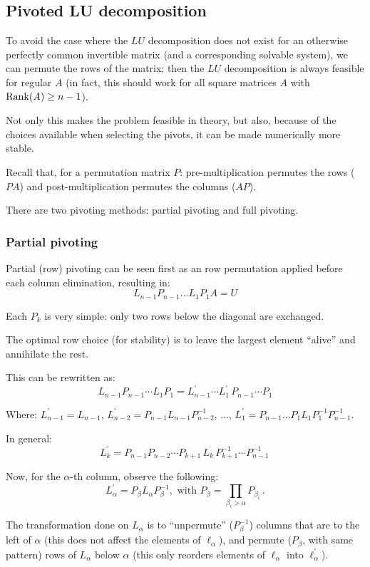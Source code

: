\documentclass[
  12pt,
  paper=a4,
]{scrartcl} %
\begin{document}
\subsection*{Pivoted LU decomposition}

To avoid the case where the $LU$ decomposition does not exist for an otherwise perfectly common invertible matrix (and a corresponding solvable system), we can permute the rows of the matrix; then the $LU$ decomposition is always feasible for regular $A$ (in fact, this should work for all square matrices $A$ with $\operatorname{Rank}(A) \ge n-1$).

Not only this makes the problem feasible in theory, but also, because of the choices available when selecting the pivots, it can be made numerically more stable.

Recall that, for a permutation matrix $P$: pre-multiplication permutes the rows ($PA$) and post-multiplication permutes the columns ($AP$).

There are two pivoting methods: partial pivoting and full pivoting.

\subsubsection*{Partial pivoting}

Partial (row) pivoting can be seen first as an row permutation applied before each column elimination, resulting in:
    \[L_{n-1}P_{n-1}...L_{1}P_{1} A = U\]

Each $P_k$ is very simple: only two rows below the diagonal are exchanged.
    
The optimal row choice (for stability) is to leave the largest element ``alive'' and annihilate the rest.
    
This can be rewritten as:
\[
    L_{n-1}P_{n-1} \cdots L_{1}P_{1} =
    L_{n-1}^\prime \cdots L_1^\prime \, P_{n-1} \cdots P_{1}
\]
    
Where: $L_{n-1}^{\prime} = L_{n-1}$, $L_{n-2}^{\prime} = P_{n-1} L_{n-1}P_{n-2}^{-1}$, ..., $L_1^\prime = P_{n-1}...P_1 L_1 P_1^{-1} P_{n-1}^{-1}$.
    
In general:
\[L^\prime_k =
    P_{n-1}P_{n-2}\cdots P_{k+1}\,
    L_k\,
    P_{k+1}^{-1}\cdots P_{n-1}^{-1}\,
\]
    
Now, for the $\alpha$-th column, observe the following:
\[
    L_\alpha^\prime = P_\beta L_\alpha P_\beta^{-1}
    , \text{ with } P_{\beta} = \prod_{\beta_i>\alpha} P_{\beta_i}
    \,.
\]

The transformation done on $L_\alpha$ is to ``unpermute'' ($P_\beta^{-1}$) columns that are to the left of $\alpha$ (this does not affect the elements of $\bm\ell_\alpha$), and permute ($P_\beta$, with same pattern) rows of $L_\alpha$ below $\alpha$ (this only reorders elements of $\bm\ell_\alpha$ into $\bm\ell_\alpha^\prime$).
\end{document}

